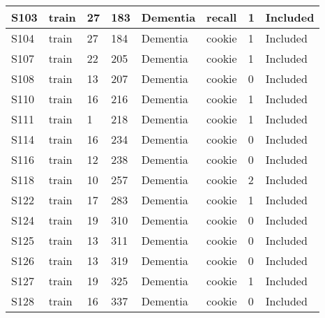 \begin{center}
\begin{longtable}{|l|l|l|l|l|l|l|l|}
S103           & train                 & 27              & 183     & Dementia       & recall          & 1            & Included      \\ \hline
S104           & train                 & 27              & 184     & Dementia       & cookie          & 1            & Included      \\ \hline
S107           & train                 & 22              & 205     & Dementia       & cookie          & 1            & Included      \\ \hline
S108           & train                 & 13              & 207     & Dementia       & cookie          & 0            & Included      \\ \hline
S110           & train                 & 16              & 216     & Dementia       & cookie          & 1            & Included      \\ \hline
S111           & train                 & 1               & 218     & Dementia       & cookie          & 1            & Included      \\ \hline
S114           & train                 & 16              & 234     & Dementia       & cookie          & 0            & Included      \\ \hline
S116           & train                 & 12              & 238     & Dementia       & cookie          & 0            & Included      \\ \hline
S118           & train                 & 10              & 257     & Dementia       & cookie          & 2            & Included      \\ \hline
S122           & train                 & 17              & 283     & Dementia       & cookie          & 1            & Included      \\ \hline
S124           & train                 & 19              & 310     & Dementia       & cookie          & 0            & Included      \\ \hline
S125           & train                 & 13              & 311     & Dementia       & cookie          & 0            & Included      \\ \hline
S126           & train                 & 13              & 319     & Dementia       & cookie          & 0            & Included      \\ \hline
S127           & train                 & 19              & 325     & Dementia       & cookie          & 1            & Included      \\ \hline
S128           & train                 & 16              & 337     & Dementia       & cookie          & 0            & Included      \\ \hline

\end{longtable}
\end{center}
